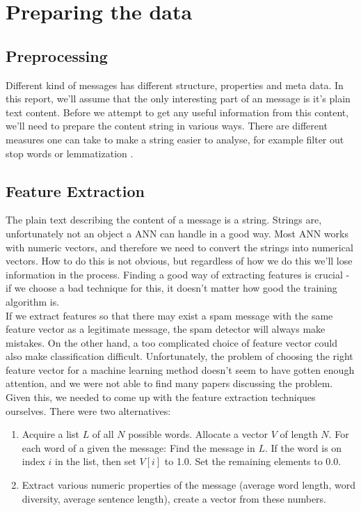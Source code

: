 
\section{Preparing the data}

\subsection{Preprocessing}

Different kind of messages has different structure, properties and
meta data. In this report, we'll assume that the only interesting part of an
message is it's plain text content. Before we attempt to get any useful
information from this content, we'll
need to prepare the content string in various ways. There are different
measures one can take to make a string easier to analyse, for example filter
out stop words \cite{stop-words} or lemmatization \cite{lemmatization}.


\subsection{Feature Extraction}

The plain text describing the content of a message is a string.  Strings are,
unfortunately not an object a ANN can handle in a good way. Most ANN works with
numeric vectors, and therefore we need to convert the strings into numerical
vectors. How to do this is not obvious, but regardless of how we do this
we'll lose information in the process. Finding a good way of extracting
features is crucial - if we choose a bad technique for this, it doesn't
matter how good the training algorithm is. \\

If we extract features so that there may exist a spam message with the same
feature vector as a legitimate message, the spam detector will always make
mistakes. On the other hand, a too complicated choice of feature vector could
also make classification difficult. Unfortunately, the problem of choosing the
right feature vector for a machine learning method doesn't seem to have gotten
enough attention, and we were not able to find many papers discussing the
problem. Given this, we needed to come up with the feature extraction
techniques ourselves. There were two alternatives:
\begin{enumerate}
  \item Acquire a list $L$ of all $N$ possible words. Allocate a vector $V$
    of length $N$. For each word of a given the message: Find the message in
    $L$.  If the word is on index $i$ in the list, then set $V[i]$ to 1.0. Set
    the remaining elements to 0.0.
  \item Extract various numeric properties of the message (average word length,
    word diversity, average sentence length), create a vector from these
    numbers.
\end{enumerate}


